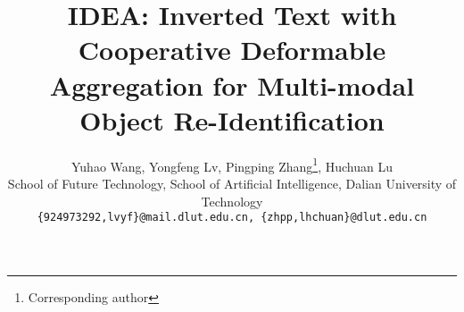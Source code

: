 \documentclass[10pt,twocolumn,letterpaper]{article}
\title{IDEA: Inverted Text with Cooperative Deformable Aggregation for Multi-modal Object Re-Identification}
\author{
    Yuhao Wang,
    Yongfeng Lv,
    Pingping Zhang\thanks{Corresponding author},
    Huchuan Lu\\
    School of Future Technology, School of Artificial Intelligence, Dalian University of Technology \\
    {\tt\small \{924973292,lvyf\}@mail.dlut.edu.cn, \{zhpp,lhchuan\}@dlut.edu.cn}
}
\begin{document}
\maketitle






{
    \small
    
    
}

\end{document}
